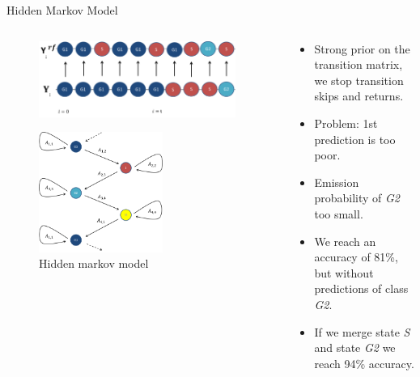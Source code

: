 \documentclass{beamer}
\begin{document}
\fi

\begin{frame}{Hidden Markov Model}

\begin{columns}[T] %
\begin{column}{.48\textwidth}
\begin{figure}[!ht]
\centering
\includegraphics[width=0.95\textwidth]{Images/HMM.png}
\label{trajectory}
\end{figure}

\begin{figure}[!ht]
\centering
\includegraphics[width=0.6\textwidth]{Images/HMCmodel4.png}
\caption{Hidden markov model}
\label{statetransition}
\end{figure}
\end{column}%

\hfill%

\begin{column}{.48\textwidth}
\begin{itemize}
\item Strong prior on the transition matrix, we stop transition skips and returns.
\item Problem: 1st prediction is too poor. 
\item Emission probability of \textit{G2} too small.
\item We reach an accuracy of 81\%, but without predictions of class \textit{G2}.
\item If we merge state \textit{S} and state \textit{G2} we reach 94\% accuracy.
\end{itemize}
\end{column}%
\end{columns}
\end{frame}
\end{document}
